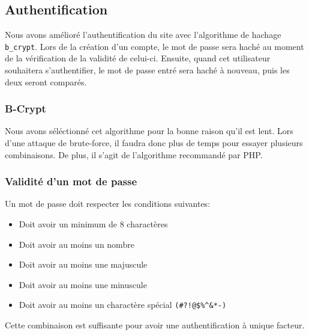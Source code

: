 \documentclass[a4paper,10pt]{article}
\begin{document}
    \subsection*{Authentification}
    Nous avons amélioré l'authentification du site avec l'algorithme de hachage \verb|b_crypt|. Lors de la création d'un compte, le mot de passe sera haché au moment de la vérification de la validité de celui-ci. Ensuite, quand cet utilisateur souhaitera s'authentifier, le mot de passe entré sera haché à nouveau, puis les deux seront comparés.
    \subsubsection*{B-Crypt}
    Nous avons séléctionné cet algorithme pour la bonne raison qu'il est lent. Lors d'une attaque de brute-force, il faudra donc plus de temps pour essayer plusieurs combinaisons. De plus, il s'agit de l'algorithme recommandé par PHP.
    \subsubsection*{Validité d'un mot de passe}
    Un mot de passe doit respecter les conditions suivantes: 
    \begin{onehalfspacing}
        \begin{itemize}
        \item Doit avoir un minimum de 8 charactères
        \item Doit avoir au moins un nombre
        \item Doit avoir au moins une majuscule
        \item Doit avoir au moins une minuscule
        \item Doit avoir au moins un charactère spécial \verb|(#?!@$%^&*-)| \\
        \end{itemize}
        \end{onehalfspacing}
        Cette combinaison est suffisante pour avoir une authentification à unique facteur.
\end{document}
